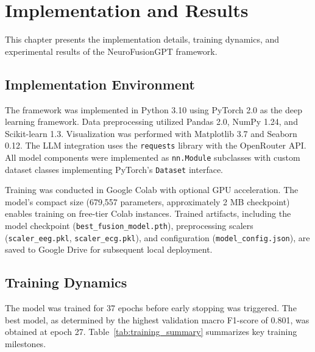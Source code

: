 \documentclass[12pt,letterpaper]{report}
\begin{document}
\clearpage
\chapter{Implementation and Results}
\label{ch:results}

This chapter presents the implementation details, training dynamics, and experimental results of the NeuroFusionGPT framework.

\section{Implementation Environment}
\label{sec:implementation}

The framework was implemented in Python 3.10 using PyTorch 2.0 as the deep learning framework. Data preprocessing utilized Pandas 2.0, NumPy 1.24, and Scikit-learn 1.3. Visualization was performed with Matplotlib 3.7 and Seaborn 0.12. The LLM integration uses the \texttt{requests} library with the OpenRouter API. All model components were implemented as \texttt{nn.Module} subclasses with custom dataset classes implementing PyTorch's \texttt{Dataset} interface.

Training was conducted in Google Colab with optional GPU acceleration. The model's compact size (679,557 parameters, approximately 2 MB checkpoint) enables training on free-tier Colab instances. Trained artifacts, including the model checkpoint (\texttt{best\_fusion\_model.pth}), preprocessing scalers (\texttt{scaler\_eeg.pkl}, \texttt{scaler\_ecg.pkl}), and configuration (\texttt{model\_config.json}), are saved to Google Drive for subsequent local deployment.

\section{Training Dynamics}
\label{sec:training_results}

The model was trained for 37 epochs before early stopping was triggered. The best model, as determined by the highest validation macro F1-score of 0.801, was obtained at epoch 27. Table~\ref{tab:training_summary} summarizes key training milestones.
\end{document}
